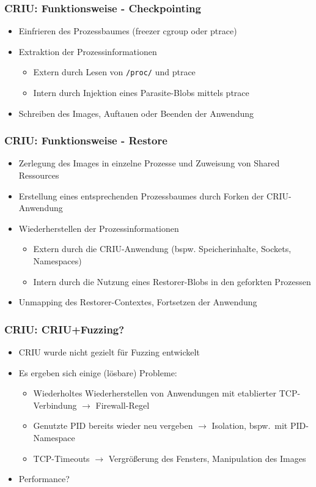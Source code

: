 \documentclass[handout]{beamer}
\begin{document}
\begin{frame}
    \frametitle{CRIU: Funktionsweise - Checkpointing}
    \begin{itemize}
        \item Einfrieren des Prozessbaumes (freezer cgroup oder ptrace)
        \item Extraktion der Prozessinformationen
            \begin{itemize}
                \item Extern durch Lesen von \texttt{/proc/} und ptrace
                \item Intern durch Injektion eines Parasite-Blobs mittels ptrace
            \end{itemize}
        \item Schreiben des Images, Auftauen oder Beenden der Anwendung
    \end{itemize}
\end{frame}

\begin{frame}
    \frametitle{CRIU: Funktionsweise - Restore}
    \begin{itemize}
        \item Zerlegung des Images in einzelne Prozesse und Zuweisung von Shared Ressources
        \item Erstellung eines entsprechenden Prozessbaumes durch Forken der CRIU-Anwendung
        \item Wiederherstellen der Prozessinformationen
            \begin{itemize}
                \item Extern durch die CRIU-Anwendung (bspw. Speicherinhalte, Sockets, Namespaces)
                \item Intern durch die Nutzung eines Restorer-Blobs in den geforkten Prozessen
            \end{itemize}
        \item Unmapping des Restorer-Contextes, Fortsetzen der Anwendung
    \end{itemize}
\end{frame}

\begin{frame}
    \frametitle{CRIU: CRIU+Fuzzing?}
    \begin{itemize}
        \item CRIU wurde nicht gezielt für Fuzzing entwickelt
        \item Es ergeben sich einige (lösbare) Probleme:
            \begin{itemize}
                \item Wiederholtes Wiederherstellen von Anwendungen mit etablierter TCP-Verbindung $\rightarrow$ Firewall-Regel
                \item Genutzte PID bereits wieder neu vergeben $\rightarrow$ Isolation, bspw.\ mit PID-Namespace
                \item TCP-Timeouts $\rightarrow$ Vergrößerung des Fensters, Manipulation des Images
            \end{itemize}
        \item Performance?
    \end{itemize}
\end{frame}
\end{document}

